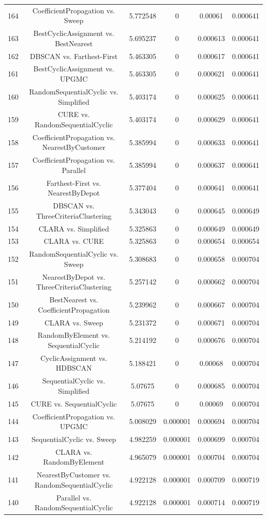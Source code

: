 \documentclass[a4paper,10pt]{article}
\begin{document}
\begin{landscape}
\begin{table}[!htp]
\begin{tabular}{cccccc}
164&CoefficientPropagation vs. Sweep&5.772548&0&0.00061&0.000641\\
163&BestCyclicAssignment vs. BestNearest&5.695237&0&0.000613&0.000641\\
162&DBSCAN vs. Farthest-First&5.463305&0&0.000617&0.000641\\
161&BestCyclicAssignment vs. UPGMC&5.463305&0&0.000621&0.000641\\
160&RandomSequentialCyclic vs. Simplified&5.403174&0&0.000625&0.000641\\
159&CURE vs. RandomSequentialCyclic&5.403174&0&0.000629&0.000641\\
158&CoefficientPropagation vs. NearestByCustomer&5.385994&0&0.000633&0.000641\\
157&CoefficientPropagation vs. Parallel&5.385994&0&0.000637&0.000641\\
156&Farthest-First vs. NearestByDepot&5.377404&0&0.000641&0.000641\\
155&DBSCAN vs. ThreeCriteriaClustering&5.343043&0&0.000645&0.000649\\
154&CLARA vs. Simplified&5.325863&0&0.000649&0.000649\\
153&CLARA vs. CURE&5.325863&0&0.000654&0.000654\\
152&RandomSequentialCyclic vs. Sweep&5.308683&0&0.000658&0.000704\\
151&NearestByDepot vs. ThreeCriteriaClustering&5.257142&0&0.000662&0.000704\\
150&BestNearest vs. CoefficientPropagation&5.239962&0&0.000667&0.000704\\
149&CLARA vs. Sweep&5.231372&0&0.000671&0.000704\\
148&RandomByElement vs. SequentialCyclic&5.214192&0&0.000676&0.000704\\
147&CyclicAssignment vs. HDBSCAN&5.188421&0&0.00068&0.000704\\
146&SequentialCyclic vs. Simplified&5.07675&0&0.000685&0.000704\\
145&CURE vs. SequentialCyclic&5.07675&0&0.00069&0.000704\\
144&CoefficientPropagation vs. UPGMC&5.008029&0.000001&0.000694&0.000704\\
143&SequentialCyclic vs. Sweep&4.982259&0.000001&0.000699&0.000704\\
142&CLARA vs. RandomByElement&4.965079&0.000001&0.000704&0.000704\\
141&NearestByCustomer vs. RandomSequentialCyclic&4.922128&0.000001&0.000709&0.000719\\
140&Parallel vs. RandomSequentialCyclic&4.922128&0.000001&0.000714&0.000719\\

\end{tabular}
\end{table}
\end{landscape}
\end{document}

